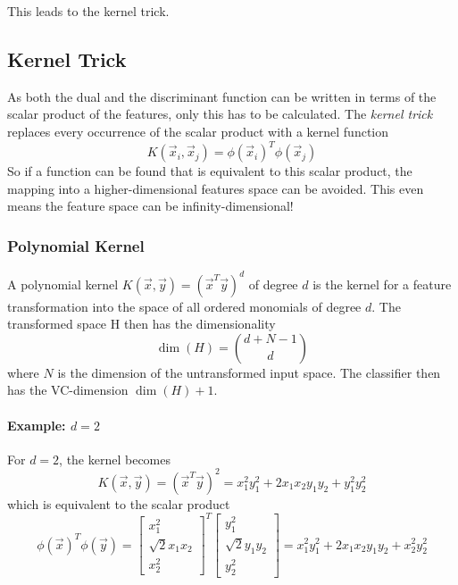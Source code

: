 			This leads to the kernel trick.

		\subsection{Kernel Trick}
			\label{sec:svmKernelTrick}

			As both the dual and the discriminant function can be written in terms of the scalar product of the features, only this has to be calculated. The \emph{kernel trick} replaces every occurrence of the scalar product with a kernel function
			\begin{equation}
				K(\vec{x}_i, \vec{x}_j) = \phi(\vec{x}_i)^T \phi(\vec{x}_j)
			\end{equation}
			So if a function can be found that is equivalent to this scalar product, the mapping into a higher-dimensional features space can be avoided. This even means the feature space can be infinity-dimensional!

			\subsubsection{Polynomial Kernel}
				A polynomial kernel \( K(\vec{x}, \vec{y}) = (\vec{x}^T \vec{y})^d \) of degree \(d\) is the kernel for a feature transformation into the space of all ordered monomials of degree \(d\). The transformed space H then has the dimensionality
				\begin{equation}
					\dim(H) = { d + N - 1 \choose d }
				\end{equation}
				where \(N\) is the dimension of the untransformed input space. The classifier then has the VC-dimension \( \dim(H) + 1 \).

				\paragraph{Example: \(d = 2\)}
					For \(d = 2\), the kernel becomes
					\begin{equation}
						K(\vec{x}, \vec{y}) = (\vec{x}^T \vec{y})^2 = x_1^2 y_1^2 + 2 x_1 x_2 y_1 y_2 + y_1^2 y_2^2
					\end{equation}
					which is equivalent to the scalar product
					\begin{equation}
						\phi(\vec{x})^T \phi(\vec{y}) =
						\begin{bmatrix}
							x_1^2            \\
							\sqrt{2} x_1 x_2 \\
							x_2^2
						\end{bmatrix}^T
						\begin{bmatrix}
							y_1^2            \\
							\sqrt{2} y_1 y_2 \\
							y_2^2
						\end{bmatrix}
						= x_1^2 y_1^2 + 2 x_1 x_2 y_1 y_2 + x_2^2 y_2^2
					\end{equation}

